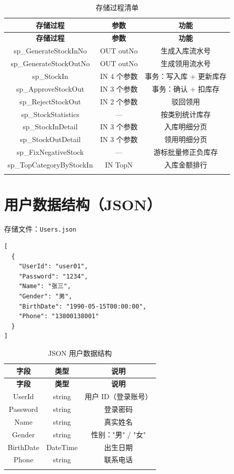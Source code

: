 \documentclass[12pt,a4paper]{ctexart}
\begin{document}
\begin{longtable}{c|c|c}
\toprule
\textbf{存储过程} & \textbf{参数} & \textbf{功能} \\
\midrule
\endfirsthead
\hline
\textbf{存储过程} & \textbf{参数} & \textbf{功能} \\
\hline
\endhead
sp\_GenerateStockInNo    & OUT outNo & 生成入库流水号 \\
sp\_GenerateStockOutNo   & OUT outNo & 生成领用流水号 \\
sp\_StockIn              & IN 4 个参数 & 事务：写入库 + 更新库存 \\
sp\_ApproveStockOut      & IN 3 个参数 & 事务：确认 + 扣库存 \\
sp\_RejectStockOut       & IN 2 个参数 & 驳回领用 \\
sp\_StockStatistics      & —          & 按类别统计库存 \\
sp\_StockInDetail        & IN 3 个参数 & 入库明细分页 \\
sp\_StockOutDetail       & IN 3 个参数 & 领用明细分页 \\
sp\_FixNegativeStock     & —          & 游标批量修正负库存 \\
sp\_TopCategoryByStockIn & IN TopN    & 入库金额排行 \\
\bottomrule
\caption{存储过程清单}
\end{longtable}

\section{用户数据结构（JSON）}

存储文件：\texttt{Users.json}

\begin{verbatim}
[
  {
    "UserId": "user01",
    "Password": "1234",
    "Name": "张三",
    "Gender": "男",
    "BirthDate": "1990-05-15T00:00:00",
    "Phone": "13800138001"
  }
]
\end{verbatim}

\begin{longtable}{c|c|c}
\toprule
\textbf{字段} & \textbf{类型} & \textbf{说明} \\
\midrule
\endfirsthead
\toprule
\textbf{字段} & \textbf{类型} & \textbf{说明} \\
\midrule
\endhead
UserId    & string   & 用户 ID（登录账号） \\
Password  & string   & 登录密码 \\
Name      & string   & 真实姓名 \\
Gender    & string   & 性别："男" / "女" \\
BirthDate & DateTime & 出生日期 \\
Phone     & string   & 联系电话 \\
\bottomrule
\caption{JSON 用户数据结构}
\end{longtable}
\end{document}
